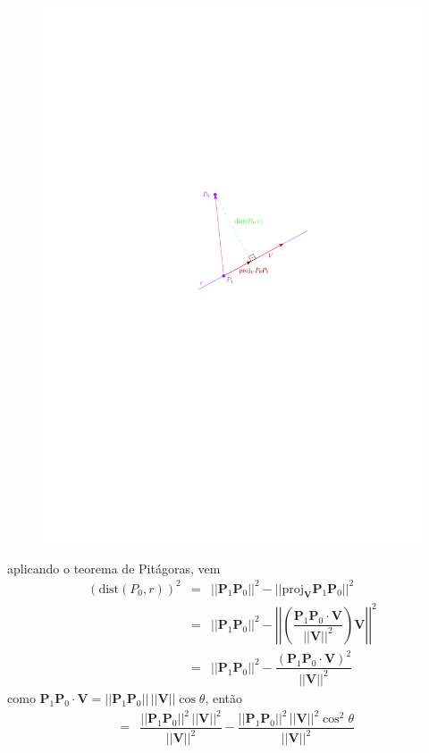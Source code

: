 \documentclass[a4paper, 12pt, brazilian]{article}
\newcommand{\vect}{\bm{P}_{1}\bm{P}_{0}}
\begin{document}
	\begin{figure}[H]
		\centering
		\includegraphics[scale=1.1]{images/dist_n}
		\label{fig:distn}
	\end{figure}
	aplicando o teorema de Pitágoras, vem
	\begin{eqnarray}
		(\textrm{dist}(P_{0},r))^{2}&=&||\vect||^{2}-||\textrm{proj}_{\bm{V}}\vect||^{2}\\
		&=&||\vect||^{2}-\left|\!\left|\left(\dfrac{\vect\cdot\bm{V}}{||\bm{V}||^{2}}\right)\bm{V}\right|\!\right|^{2}\\
		&=&||\vect||^{2}-\dfrac{(\vect\cdot\bm{V})^{2}}{||\bm{V}||^{2}}
	\end{eqnarray}
	como $\vect\cdot\bm{V}=||\vect||\,||\bm{V}||\cos\theta$, então
	\begin{eqnarray}
		&=&\dfrac{||\vect||^{2}\,||\bm{V}||^{2}}{||\bm{V}||^{2}}-\dfrac{||\vect||^{2}\,||\bm{V}||^{2}\cos^{2}\theta}{||\bm{V}||^{2}}
	\end{eqnarray}
\end{document}
